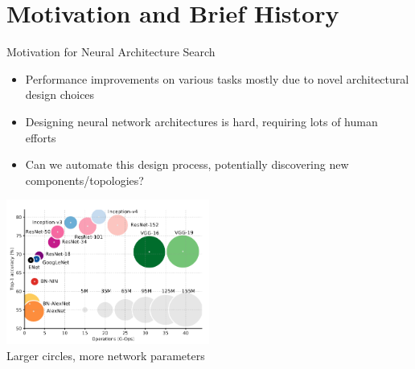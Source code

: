 \section{Motivation and Brief History}
\begin{frame}[c]{Motivation for Neural Architecture Search}

\centering
\begin{itemize}
  \item Performance improvements on various tasks mostly due to novel architectural design choices
  \item Designing neural network architectures is hard, requiring lots of human efforts
  \item Can we automate this design process, potentially discovering new components/topologies?
\end{itemize}
	
\includegraphics[width=0.5\textwidth]{images_lec7/architectures_perf.png}\\
Larger circles, more network parameters 

\end{frame}
